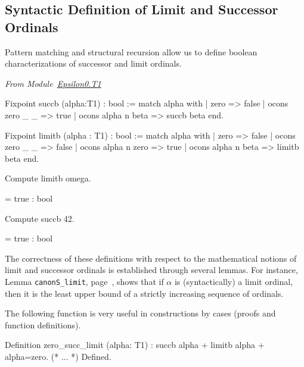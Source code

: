 \subsection{Syntactic Definition of Limit and Successor Ordinals}

Pattern matching and structural recursion allow us to define boolean characterizations  of successor and limit ordinals.


\vspace{4pt}
\noindent
\emph{From Module~\href{../theories/html/hydras.Epsilon0.T1.html\#succb}{Epsilon0.T1}}

\begin{Coqsrc}
Fixpoint succb (alpha:T1) : bool :=
  match alpha with
    | zero => false
    | ocons zero _ _ => true
    | ocons alpha n beta => succb beta
  end.

Fixpoint limitb (alpha : T1) : bool :=
  match alpha with
    | zero => false
    | ocons zero _ _ => false
    | ocons alpha n zero => true
    | ocons alpha n beta => limitb beta
  end.
\end{Coqsrc}



\begin{Coqsrc}
  Compute limitb omega.
\end{Coqsrc}

\begin{Coqanswer}
  = true
     : bool
\end{Coqanswer}

\begin{Coqsrc}
Compute succb 42.
\end{Coqsrc}

\begin{Coqanswer}
  = true
     : bool
\end{Coqanswer}

The correctness of these definitions with respect to the mathematical notions of
limit and successor ordinals is established through several lemmas. For instance,
Lemma \texttt{canonS\_limit}, page~\pageref{lemma:canonS-limit}, shows that
if $\alpha$ is (syntactically) a limit ordinal, then it is the least upper bound of
a strictly increasing sequence of ordinals.


   The following function is very useful in constructions by cases (proofs and function definitions).
   
\begin{Coqsrc}
Definition zero_succ_limit (alpha: T1) :
    {succb alpha} + {limitb alpha} +  {alpha=zero}.
    (* ... *)
Defined.
\end{Coqsrc}



